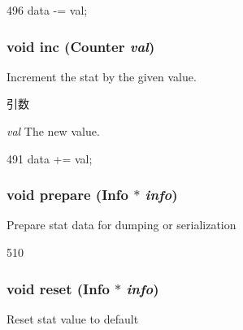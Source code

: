 \begin{DoxyCode}
496 { data -= val; }
\end{DoxyCode}
\hypertarget{classStats_1_1StatStor_a8e52de5dde7b3cab8328c91dbbb1f229}{
\subsubsection[{inc}]{\setlength{\rightskip}{0pt plus 5cm}void inc ({\bf Counter} {\em val})}}
\label{classStats_1_1StatStor_a8e52de5dde7b3cab8328c91dbbb1f229}
Increment the stat by the given value. 
\begin{DoxyParams}{引数}
\item[{\em val}]The new value. \end{DoxyParams}



\begin{DoxyCode}
491 { data += val; }
\end{DoxyCode}
\hypertarget{classStats_1_1StatStor_a496667796a30696e960f80f4e3d69e69}{
\subsubsection[{prepare}]{\setlength{\rightskip}{0pt plus 5cm}void prepare ({\bf Info} $\ast$ {\em info})}}
\label{classStats_1_1StatStor_a496667796a30696e960f80f4e3d69e69}
Prepare stat data for dumping or serialization 


\begin{DoxyCode}
510 { }
\end{DoxyCode}
\hypertarget{classStats_1_1StatStor_a10d9d71be6e0d2194999bb5dd5280e2d}{
\subsubsection[{reset}]{\setlength{\rightskip}{0pt plus 5cm}void reset ({\bf Info} $\ast$ {\em info})}}
\label{classStats_1_1StatStor_a10d9d71be6e0d2194999bb5dd5280e2d}
Reset stat value to default 


